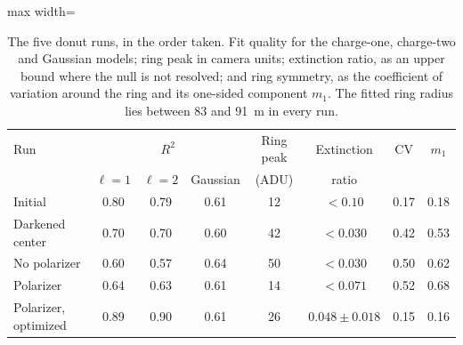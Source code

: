 \documentclass{article}
\begin{document}
\begin{table}[!htbp]
    \centering
    \small
    \setlength{\tabcolsep}{4pt}
    \begin{adjustbox}{max width=\linewidth}
    \begin{tabular}{lccccccc}
        \hline
        Run & \multicolumn{3}{c}{$R^2$} & Ring peak & Extinction & CV & $m_1$ \\
            & $\ell=1$ & $\ell=2$ & Gaussian & (ADU) & ratio & & \\
        \hline
        Initial                & 0.80 & 0.79 & 0.61 & 12 & $<0.10$           & 0.17 & 0.18 \\
        Darkened center        & 0.70 & 0.70 & 0.60 & 42 & $<0.030$          & 0.42 & 0.53 \\
        No polarizer           & 0.60 & 0.57 & 0.64 & 50 & $<0.030$          & 0.50 & 0.62 \\
        Polarizer              & 0.64 & 0.63 & 0.61 & 14 & $<0.071$          & 0.52 & 0.68 \\
        Polarizer, optimized   & 0.89 & 0.90 & 0.61 & 26 & $0.048 \pm 0.018$ & 0.15 & 0.16 \\
        \hline
    \end{tabular}
    \end{adjustbox}
    \caption{The five donut runs, in the order taken. Fit quality for the
    charge-one, charge-two and Gaussian models; ring peak in camera units; extinction ratio, as an
    upper bound where the null is not resolved; and ring symmetry, as the coefficient of variation
    around the ring and its one-sided component $m_1$. The fitted ring radius lies between 83 and
    91~\textmu m in every run.}
    \label{tab:donut-runs}
\end{table}
\end{document}
